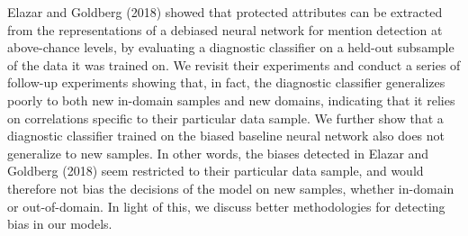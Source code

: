 Elazar and Goldberg (2018) showed that protected attributes can be extracted from the representations of a debiased neural network for mention detection at above-chance levels,  by evaluating a diagnostic classifier on a held-out subsample of the data it was trained on. We revisit their experiments and conduct a series of follow-up experiments showing that, in fact, the diagnostic  classifier generalizes poorly to both new in-domain samples and new domains, indicating that it relies on correlations specific to their particular data sample. We further show that a diagnostic classifier trained on the biased baseline neural network also does not generalize to new samples. In other words, the biases detected in Elazar and Goldberg (2018) seem restricted to their particular data sample, and would therefore not bias the decisions of the model on new samples, whether in-domain or out-of-domain. In light of this, we discuss better methodologies for detecting bias in our models.
